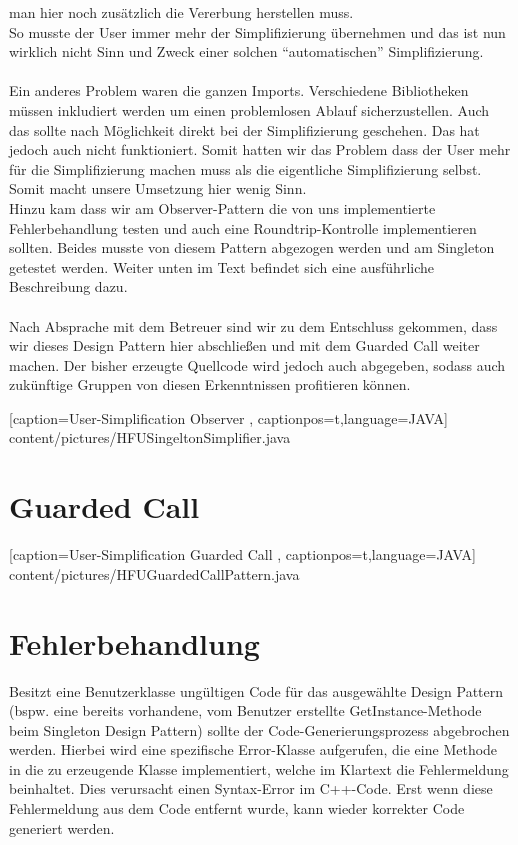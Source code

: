 man hier noch zusätzlich die Vererbung herstellen muss.\\
So musste der User immer mehr der Simplifizierung übernehmen und das ist nun
wirklich nicht Sinn und Zweck einer solchen \enquote{automatischen} Simplifizierung.\\
\\
Ein anderes Problem waren die ganzen Imports. Verschiedene Bibliotheken müssen
inkludiert werden um einen problemlosen Ablauf sicherzustellen. Auch das sollte
nach Möglichkeit direkt bei der Simplifizierung geschehen. Das hat jedoch auch
nicht funktioniert. Somit hatten wir das Problem dass der User mehr für die
Simplifizierung machen muss als die eigentliche Simplifizierung selbst. Somit
macht unsere Umsetzung hier wenig Sinn.\\
Hinzu kam dass wir am Observer-Pattern die von uns implementierte Fehlerbehandlung
testen und auch eine Roundtrip-Kontrolle implementieren sollten. Beides musste
von diesem Pattern abgezogen werden und am Singleton getestet werden. Weiter
unten im Text befindet sich eine ausführliche Beschreibung dazu.\\ \\
Nach Absprache mit dem Betreuer sind wir zu dem Entschluss gekommen, dass wir
dieses Design Pattern hier abschließen und mit dem Guarded Call weiter machen.
Der bisher erzeugte Quellcode wird jedoch auch abgegeben, sodass auch zukünftige
Gruppen von diesen Erkenntnissen profitieren können.

    [caption={User-Simplification Observer}
       \label{lst:javaclass},
       captionpos=t,language=JAVA]
 {content/pictures/HFUSingeltonSimplifier.java} 


\section{Guarded Call}

    [caption={User-Simplification Guarded Call}
       \label{lst:javaclass},
       captionpos=t,language=JAVA]
 {content/pictures/HFUGuardedCallPattern.java} 

\section{Fehlerbehandlung}

Besitzt eine Benutzerklasse ungültigen Code für das ausgewählte Design Pattern (bspw. eine 
bereits vorhandene, vom Benutzer erstellte GetInstance-Methode beim Singleton Design Pattern) 
sollte der Code-Generierungsprozess abgebrochen werden. Hierbei wird eine spezifische Error-Klasse aufgerufen, die eine Methode in die zu erzeugende Klasse implementiert, welche im Klartext die Fehlermeldung beinhaltet. Dies verursacht einen Syntax-Error im C++-Code. Erst wenn diese Fehlermeldung aus dem Code entfernt wurde, kann wieder korrekter Code generiert werden.

